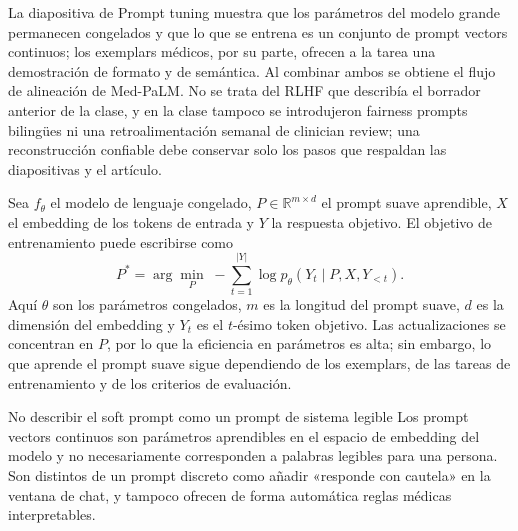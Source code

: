 La diapositiva de Prompt tuning muestra que los parámetros del modelo grande permanecen congelados y que lo que se entrena es un conjunto de prompt vectors continuos; los exemplars médicos, por su parte, ofrecen a la tarea una demostración de formato y de semántica. Al combinar ambos se obtiene el flujo de alineación de Med-PaLM. No se trata del RLHF que describía el borrador anterior de la clase, y en la clase tampoco se introdujeron fairness prompts bilingües ni una retroalimentación semanal de clinician review; una reconstrucción confiable debe conservar solo los pasos que respaldan las diapositivas y el artículo.



Sea $f_{\theta}$ el modelo de lenguaje congelado, $P\in\mathbb{R}^{m\times d}$ el prompt suave aprendible, $X$ el embedding de los tokens de entrada y $Y$ la respuesta objetivo. El objetivo de entrenamiento puede escribirse como
$$
P^{*}=\arg\min_{P}\; -\sum_{t=1}^{|Y|}\log p_{\theta}(Y_t\mid P,X,Y_{<t}).
$$
Aquí $\theta$ son los parámetros congelados, $m$ es la longitud del prompt suave, $d$ es la dimensión del embedding y $Y_t$ es el $t$-ésimo token objetivo. Las actualizaciones se concentran en $P$, por lo que la eficiencia en parámetros es alta; sin embargo, lo que aprende el prompt suave sigue dependiendo de los exemplars, de las tareas de entrenamiento y de los criterios de evaluación.


\begin{warningbox}{No describir el soft prompt como un prompt de sistema legible}
Los prompt vectors continuos son parámetros aprendibles en el espacio de embedding del modelo y no necesariamente corresponden a palabras legibles para una persona. Son distintos de un prompt discreto como añadir «responde con cautela» en la ventana de chat, y tampoco ofrecen de forma automática reglas médicas interpretables.
\end{warningbox}

